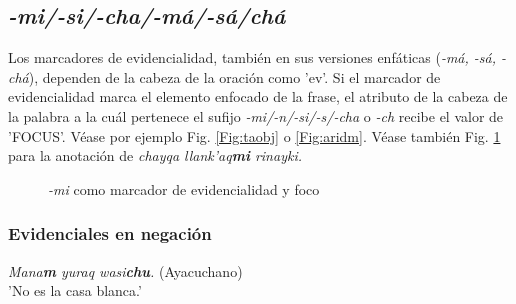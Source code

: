 \documentclass[a4paper,11pt,DIV12]{scrartcl}
\begin{document}
  \subsection{{\em-mi/-si/-cha/-m\'a/-s\'a/ch\'a}}\label{Sec:evidenciales}

Los marcadores de evidencialidad, tambi\'en en sus versiones enf\'aticas ({\em -m\'a, -s\'a, -ch\'a}), dependen de la cabeza de la oraci\'on como 'ev'.
Si el marcador de evidencialidad marca el elemento enfocado de la frase, el atributo de la cabeza de la palabra a la cu\'al pertenece el sufijo {\em -mi/-n/-si/-s/-cha} o {\em -ch} recibe el valor de 'FOCUS'. V\'ease por ejemplo Fig. \ref{Fig:taobj} o  \ref{Fig:aridm}. 
 V\'ease tambi\'en Fig. \ref{Fig:miFOCUS} para la anotaci\'on de {\em chayqa llank'aq\textbf{mi} rinayki.}\\ 

\begin{figure}
\begin{center}
 \caption{{\em -mi} como marcador de evidencialidad y foco}\label{Fig:miFOCUS}
\end{center}
\end{figure}

\subsubsection{Evidenciales en negaci\'on}
\begin{examples}
 \item {\em Mana\textbf{m} yuraq wasi\textbf{chu}.} (Ayacuchano)\\
      'No es la casa blanca.'\\
      		\hfill{\small \citep[121]{Soto76a}}
\end{examples}
\end{document}
